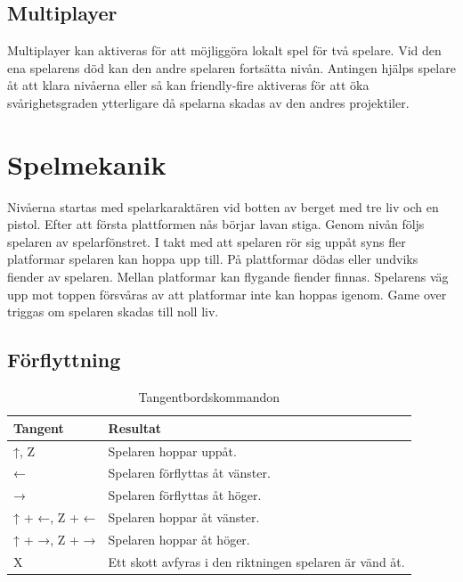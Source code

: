 \documentclass{TDP005mall}
\begin{document}
\subsection{Multiplayer}
Multiplayer kan aktiveras för att möjliggöra lokalt spel för två spelare. Vid den ena spelarens död kan den andre spelaren fortsätta nivån. Antingen hjälps spelare åt att klara nivåerna eller så kan friendly-fire aktiveras för att öka svårighetsgraden ytterligare då spelarna skadas av den andres projektiler.

\section{Spelmekanik}%
Nivåerna startas med spelarkaraktären vid botten av berget med tre liv och en pistol. Efter att första plattformen nås börjar lavan stiga. Genom nivån följs spelaren av spelarfönstret. I takt med att spelaren rör sig uppåt syns fler platformar spelaren kan hoppa upp till. På plattformar dödas eller undviks fiender av spelaren. Mellan platformar kan flygande fiender finnas. Spelarens väg upp mot toppen försvåras av att platformar inte kan hoppas igenom. Game over triggas om spelaren skadas till noll liv.
\newpage
\subsection{Förflyttning} %

\begin{table}[h!]
  \caption{Tangentbordskommandon\label{tab:1}}
\begin{tabular}{|l|l|}
\hline
Tangent & Resultat \\\hline
↑, Z & Spelaren hoppar uppåt. \\\hline
← & Spelaren förflyttas åt vänster. \\\hline
→ & Spelaren förflyttas åt höger. \\\hline
↑ + ←, Z + ← & Spelaren hoppar åt vänster. \\\hline
↑ + →, Z + → & Spelaren hoppar åt höger. \\\hline
X & Ett skott avfyras i den riktningen spelaren är vänd åt. \\\hline
\end{tabular}
\end{table}
\end{document}
